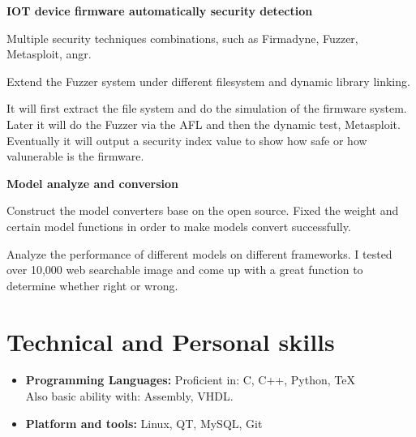 \documentclass[11pt,a4paper,sans]{moderncv}        %
\begin{document}
\vspace{4pt}

\begin{itemize}

\item{\textbf{IOT device firmware automatically security detection} 

\vspace{3pt}

\small{ \item[--] Multiple security techniques combinations, such as Firmadyne, Fuzzer, Metasploit, angr.}
\small{ \item[--] Extend the Fuzzer system under different filesystem and dynamic library linking.}
\small{ \item[--] It will first extract the file system and do the simulation of the firmware system. Later it will do the Fuzzer via the AFL and then the dynamic test, Metasploit. Eventually it will output a security index value to show how safe or how valunerable is the firmware.  }


}

\item{\textbf{Model analyze and conversion} 

\vspace{3pt}

\small{ \item[--] Construct the model converters base on the open source. Fixed the weight and certain model functions in order to make models convert successfully. }
\small{ \item[--] Analyze the performance of different models on different frameworks. I tested over 10,000 web searchable image and come up with a great function to determine whether right or wrong.  }
}


\vspace{6pt}

\end{itemize}




\section{Technical and Personal skills}

\vspace{6pt}

\begin{itemize}

\item \textbf{Programming Languages:} Proficient in: C, C++, Python, TeX \\ Also basic ability with: Assembly, VHDL.
\vspace{6pt}
\item \textbf{Platform and tools: } Linux, QT, MySQL, Git
\vspace{6pt}

\vspace{6pt}

\end{itemize}
\end{document}

